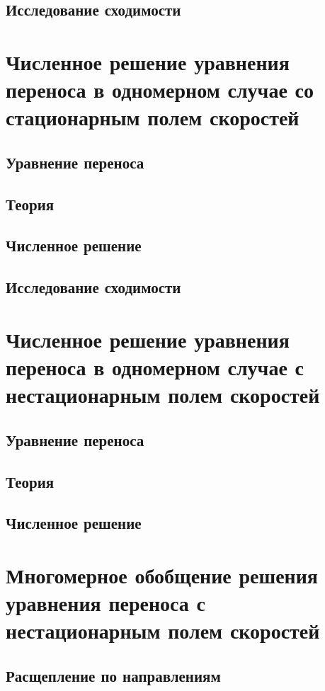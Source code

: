 \documentclass[12pt,a4paper]{article}
\begin{document}
\subsection{Исследование сходимости}

\section{Численное решение уравнения переноса в одномерном случае со стационарным полем скоростей}
\subsection{Уравнение переноса}
\subsection{Теория}
\subsection{Численное решение}
\subsection{Исследование сходимости}

\section{Численное решение уравнения переноса в одномерном случае с нестационарным полем скоростей}
\subsection{Уравнение переноса}
\subsection{Теория}
\subsection{Численное решение}

\section{Многомерное обобщение решения уравнения переноса с нестационарным полем скоростей}
\subsection{Расщепление по направлениям}
\end{document}
